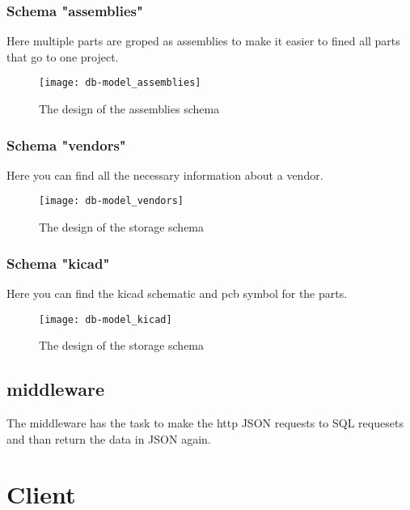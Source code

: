 \newpage
\subsubsection{Schema "assemblies"}
Here multiple parts are groped as assemblies to make it easier to fined all parts that go to one project.

\begin{figure}[h]
	\texttt{[image: db-model\_assemblies]}
	\centering
	\caption{The design of the assemblies schema}
\end{figure}

\newpage
\subsubsection{Schema "vendors"}
Here you can find all the necessary information about a vendor.

\begin{figure}[h]
	\texttt{[image: db-model\_vendors]}
	\centering
	\caption{The design of the storage schema}
\end{figure}

\newpage
\subsubsection{Schema "kicad"}
Here you can find the kicad schematic and pcb symbol for the parts.

\begin{figure}[h]
	\texttt{[image: db-model\_kicad]}
	\centering
	\caption{The design of the storage schema}
\end{figure}

\newpage
\subsection{middleware}
The middleware has the task to make the http JSON requests to SQL requesets and than return the data in JSON again.

\newpage
\section{Client}